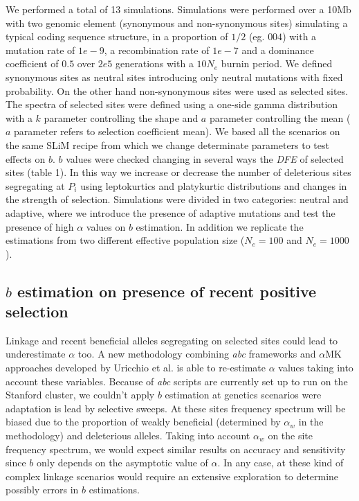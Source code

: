 \documentclass[11pt]{article}
\begin{document}
We performed a total of 13 simulations. Simulations were performed over a 10Mb with two genomic element (synonymous and non-synonymous sites) simulating a typical coding sequence structure, in a proportion of ${1}/{2}$ (eg. $004$) with a mutation rate of $1e-9$, a recombination rate of $1e-7$ and a dominance coefficient of $0.5$ over $2e5$ generations with a $10N_{e}$ burnin period. We defined synonymous sites as neutral sites introducing only neutral mutations with fixed probability. On the other hand non-synonymous sites were used as selected sites. The spectra of selected sites were defined using a one-side gamma distribution with a $k$ parameter controlling the shape and $a$ parameter controlling the mean ($a$ parameter refers to selection coefficient mean). We based all the scenarios on the same SLiM recipe from which we change determinate parameters to test effects on $b$. $b$ values were checked changing in several ways the \emph{DFE} of selected sites (table 1). In this way we increase or decrease the number of deleterious sites segregating at $P_{i}$ using leptokurtics and platykurtic distributions and changes in the strength of selection. Simulations were divided in two categories: neutral and adaptive, where we introduce the presence of adaptive mutations and test the presence of high $\alpha$ values on $b$ estimation. In addition we replicate the estimations from two different effective population size ($N_{e} = 100$ and $N_{e} = 1000$).


\subsection{$b$  estimation on presence of recent positive selection}

Linkage and recent beneficial alleles segregating on selected sites could lead to underestimate $\alpha$ too. A new methodology combining \emph{abc} frameworks and $\alpha$MK approaches developed by Uricchio et al. is able to re-estimate $\alpha$ values taking into account these variables. Because of \emph{abc} scripts are currently set up to run on the Stanford cluster, we couldn't apply $b$ estimation at genetics scenarios were adaptation is lead by selective sweeps. At these sites frequency spectrum will be biased due to the proportion of weakly beneficial (determined by $\alpha_w$ in the methodology) and deleterious alleles. Taking into account $\alpha_w$ on the site frequency spectrum, we would expect similar results on accuracy and sensitivity since $b$ only depends on the asymptotic value of $\alpha$. In any case, at these kind of complex linkage scenarios would require an extensive exploration to determine possibly errors in $b$ estimations.




    
    
    
\end{document}
